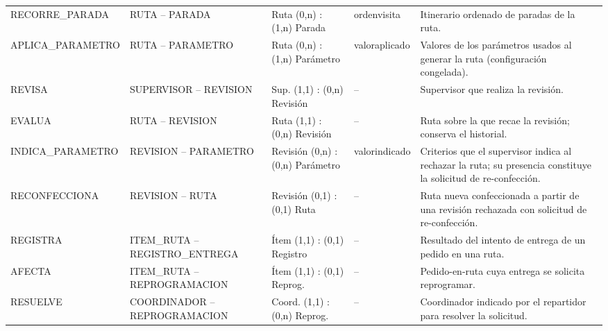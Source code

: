 \documentclass[11pt,a4paper]{article}
\newcommand{\ubrk}{\textunderscore\allowbreak}
\newcommand{\campo}[1]{\textnormal{\ttfamily\let\_\ubrk #1}}
\begin{document}
{\begin{longtable}{P{0.19\textwidth}P{0.23\textwidth}P{0.16\textwidth}P{0.12\textwidth}P{0.20\textwidth}}
RECORRE\_PARADA & RUTA -- PARADA & Ruta (0,n) : (1,n) Parada & \campo{orden\_visita} & Itinerario ordenado de paradas de la ruta.\\
APLICA\_PARAMETRO & RUTA -- PARAMETRO & Ruta (0,n) : (1,n) Parámetro & \campo{valor\_aplicado} & Valores de los parámetros usados al generar la ruta (configuración congelada).\\
REVISA & SUPERVISOR -- REVISION & Sup. (1,1) : (0,n) Revisión & -- & Supervisor que realiza la revisión.\\
EVALUA & RUTA -- REVISION & Ruta (1,1) : (0,n) Revisión & -- & Ruta sobre la que recae la revisión; conserva el historial.\\
INDICA\_PARAMETRO & REVISION -- PARAMETRO & Revisión (0,n) : (0,n) Parámetro & \campo{valor\_indicado} & Criterios que el supervisor indica al rechazar la ruta; su presencia constituye la solicitud de re-confección.\\
RECONFECCIONA & REVISION -- RUTA & Revisión (0,1) : (0,1) Ruta & -- & Ruta nueva confeccionada a partir de una revisión rechazada con solicitud de re-confección.\\
REGISTRA & ITEM\_RUTA -- REGISTRO\_ENTREGA & Ítem (1,1) : (0,1) Registro & -- & Resultado del intento de entrega de un pedido en una ruta.\\
AFECTA & ITEM\_RUTA -- REPROGRAMACION & Ítem (1,1) : (0,1) Reprog. & -- & Pedido-en-ruta cuya entrega se solicita reprogramar.\\
RESUELVE & COORDINADOR -- REPROGRAMACION & Coord. (1,1) : (0,n) Reprog. & -- & Coordinador indicado por el repartidor para resolver la solicitud.\\
\bottomrule
\end{longtable}
}
\end{document}
